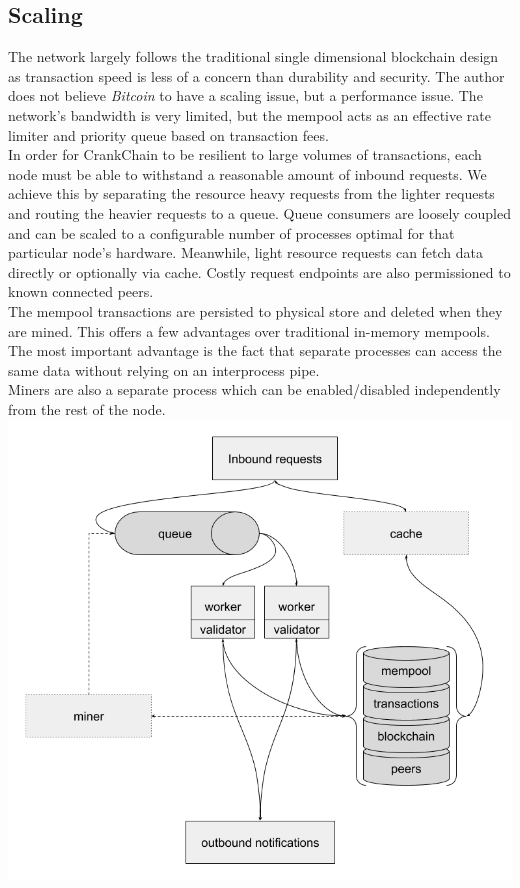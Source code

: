\documentclass[10pt,twocolumn]{article}
\begin{document}
\subsection{Scaling}
The network largely follows the traditional single dimensional blockchain design as transaction speed is less of a concern than durability and security.  The author does not believe \textit{Bitcoin} to have a scaling issue\cite{wiki:btcscalability}, but a performance issue.  The network's bandwidth is very limited, but the mempool acts as an effective rate limiter and priority queue based on transaction fees.\\
In order for CrankChain to be resilient to large volumes of transactions, each node must be able to withstand a reasonable amount of inbound requests.  We achieve this by separating the resource heavy requests from the lighter requests and routing the heavier requests to a queue.  Queue consumers are loosely coupled and can be scaled to a configurable number of processes optimal for that particular node's hardware.  Meanwhile, light resource requests can fetch data directly or optionally via cache.  Costly request endpoints are also permissioned to known connected peers.\\
The mempool transactions are persisted to physical store and deleted when they are mined.  This offers a few advantages over traditional in-memory mempools.  The most important advantage is the fact that separate processes can access the same data without relying on an interprocess pipe.\\
Miners are also a separate process which can be enabled/disabled independently from the rest of the node.
\includegraphics[width=1.00\linewidth]{node_design.png}
\end{document}
